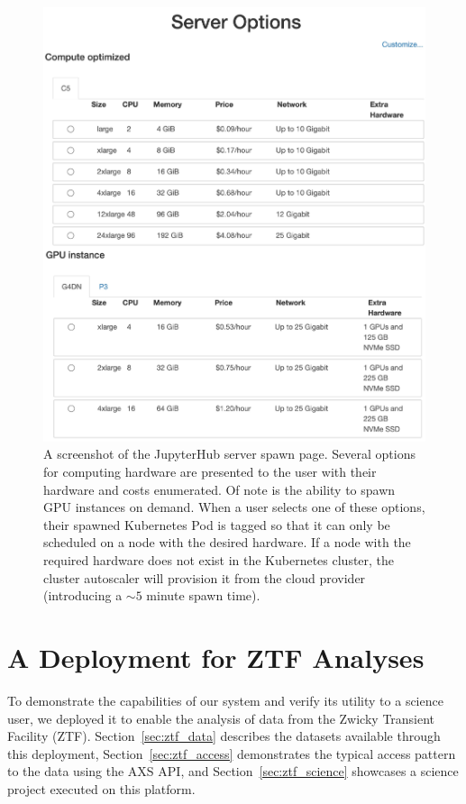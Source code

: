 \documentclass[twocolumn, linenumbers]{aastex631}
\begin{document}
\begin{figure}
    \centering
    \includegraphics[width=\linewidth]{options_form.pdf}
    \caption{A screenshot of the JupyterHub server spawn page. Several options for computing hardware are presented to the user with their hardware and costs enumerated. Of note is the ability to spawn GPU instances on demand. When a user selects one of these options, their spawned Kubernetes Pod is tagged so that it can only be scheduled on a node with the desired hardware. If a node with the required hardware does not exist in the Kubernetes cluster, the cluster autoscaler will provision it from the cloud provider (introducing a ${\sim}5$ minute spawn time).}
    \label{fig:spawn_page}
\end{figure}

\section{A Deployment for ZTF Analyses}
\label{sec:ztf}

To demonstrate the capabilities of our system and verify its utility to a science user, we deployed it to enable the analysis of data from the Zwicky Transient Facility (ZTF). Section~\ref{sec:ztf_data} describes the datasets available through this deployment, Section~\ref{sec:ztf_access} demonstrates the typical access pattern to the data using the AXS API, and Section~\ref{sec:ztf_science} showcases a science project executed on this platform.
\end{document}
